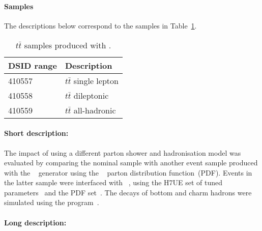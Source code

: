 \subsubsection[Powheg+Herwig7.04]{\POWHER[7.04]}
\label{subsubsec:ttbar_PH7}

\paragraph{Samples}

The descriptions below correspond to the samples in Table~\ref{tab:ttbar_PH7}.
\begin{table}[htbp]
\begin{center}
\caption{$t\bar{t}$ samples produced with \POWHER[7]. }
\label{tab:ttbar_PH7}
\begin{tabular}{ l | l }
\hline
DSID range & Description \\
\hline
410557 & $t\bar{t}$ single lepton  \\
410558 & $t\bar{t}$ dileptonic  \\
410559 & $t\bar{t}$ all-hadronic  \\
\hline
\end{tabular}
\end{center}
\end{table}


\paragraph{Short description:}

The impact of using a different parton shower and hadronisation model was evaluated
by comparing the nominal \ttbar sample with another event sample produced with the
\POWHEGBOX[v2]~\cite{Frixione:2007nw,Nason:2004rx,Frixione:2007vw,Alioli:2010xd}
generator using the \NNPDF[3.0nlo]~\cite{Ball:2014uwa} parton distribution function~(PDF). 
Events in the latter sample were interfaced with \HERWIG[7.04]~\cite{Bahr:2008pv,Bellm:2015jjp}, 
using the H7UE set of tuned parameters~\cite{Bellm:2015jjp} and the 
\MMHT[lo] PDF set~\cite{Harland-Lang:2014zoa}.
The decays of bottom and charm hadrons
were simulated using the \EVTGEN[1.6.0] program~\cite{Lange:2001uf}. 

\paragraph{Long description:}

